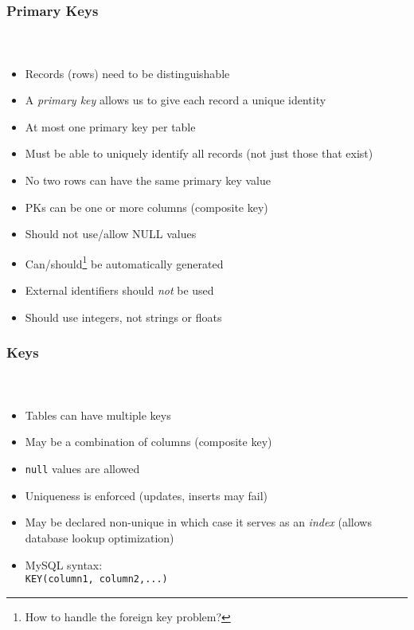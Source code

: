 \documentclass{beamer}
\begin{document}
\begin{frame}[fragile]
  \frametitle{Primary Keys}
  \framesubtitle{~}

\begin{itemize}
  \item Records (rows) need to be distinguishable
  \item A \emph{primary key} allows us to give each record a unique identity
  \item At most one primary key per table
  \item Must be able to uniquely identify all records (not just those that exist)
  \item No two rows can have the same primary key value
  \item PKs can be one or more columns (composite key)
  \item Should not use/allow NULL values
  \item Can/should\footnote{How to handle the foreign key problem?} be automatically generated
  \item External identifiers should \emph{not} be used
  \item Should use integers, not strings or floats
\end{itemize}

\end{frame}

\begin{frame}[fragile]
  \frametitle{Keys}
  \framesubtitle{~}

\begin{itemize}
  \item Tables can have multiple keys
  \item May be a combination of columns (composite key)
  \item \texttt{null} values are allowed
  \item Uniqueness is enforced (updates, inserts may fail)
  \item May be declared non-unique in which case it serves as an \emph{index} (allows database lookup optimization)
  \item MySQL syntax: \\
	\texttt{KEY(column1, column2,...)}
\end{itemize}

\end{frame}
\end{document}
